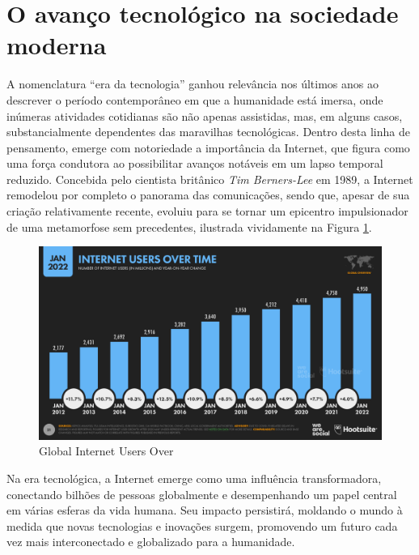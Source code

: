\section{O avanço tecnológico na sociedade moderna}

A nomenclatura ``era da tecnologia'' ganhou relevância nos últimos anos ao descrever o período contemporâneo em que a humanidade está imersa, onde inúmeras atividades cotidianas são não apenas assistidas, mas, em alguns casos, substancialmente dependentes das maravilhas tecnológicas. Dentro desta linha de pensamento, emerge com notoriedade a importância da Internet, que figura como uma força condutora ao possibilitar avanços notáveis em um lapso temporal reduzido. Concebida pelo cientista britânico \textit{Tim Berners-Lee} em 1989, a Internet remodelou por completo o panorama das comunicações, sendo que, apesar de sua criação relativamente recente, evoluiu para se tornar um epicentro impulsionador de uma metamorfose sem precedentes, ilustrada vividamente na Figura \ref{GlobalInternetUsers}.

\begin{figure}[H]
	\centering
	\includegraphics[scale=0.3]{imagens/revisaoLeitura/global_internet_users_over.png}
	\caption{Global Internet Users Over }
	\label{GlobalInternetUsers}
\end{figure}

Na era tecnológica, a Internet emerge como uma influência transformadora, conectando bilhões de pessoas globalmente e desempenhando um papel central em várias esferas da vida humana. Seu impacto persistirá, moldando o mundo à medida que novas tecnologias e inovações surgem, promovendo um futuro cada vez mais interconectado e globalizado para a humanidade.

